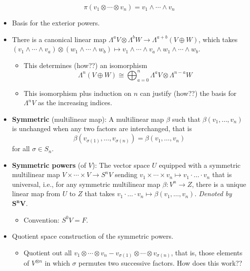 \documentclass[../notes.tex]{subfiles}
\begin{document}
\begin{itemize}
\begin{equation*}
        \pi(v_1\otimes\cdots\otimes v_n) = v_1\wedge\cdots\wedge v_n
    \end{equation*}
    \item Basis for the exterior powers.
    \item There is a canonical linear map $\Lambda^aV\otimes\Lambda^bW\to\Lambda^{a+b}(V\oplus W)$, which takes $(v_1\wedge\cdots\wedge v_a)\otimes(w_1\wedge\cdots\wedge w_b)\mapsto v_1\wedge\cdots\wedge v_a\wedge w_1\wedge\cdots\wedge w_b$.
    \begin{itemize}
        \item This determines (how??) an isomorphism
        \begin{equation*}
            \Lambda^n(V\oplus W) \cong \bigoplus_{a=0}^n\Lambda^aV\otimes\Lambda^{n-a}W
        \end{equation*}
        \item This isomorphism plus induction on $n$ can justify (how??) the basis for $\Lambda^nV$ as the increasing indices.
    \end{itemize}
    \item \textbf{Symmetric} (multilinear map): A multilinear map $\beta$ such that $\beta(v_1,\dots,v_n)$ is unchanged when any two factors are interchanged, that is
    \begin{equation*}
        \beta(v_{\sigma(1)},\dots,v_{\sigma(n)}) = \beta(v_1,\dots,v_n)
    \end{equation*}
    for all $\sigma\in S_n$.
    \item \textbf{Symmetric powers} (of $V$): The vector space $U$ equipped with a symmetric multilinear map $V\times\cdots\times V\to S^nV$ sending $v_1\times\cdots\times v_n\mapsto v_1\cdot\ldots\cdot v_n$ that is universal, i.e., for any symmetric multilinear map $\beta:V^n\to Z$, there is a unique linear map from $U$ to $Z$ that takes $v_1\cdot\ldots\cdot v_n\mapsto\beta(v_1,\dots,v_n)$. \emph{Denoted by} $\bm{S^nV}$.
    \begin{itemize}
        \item Convention: $S^0V=F$.
    \end{itemize}
    \item Quotient space construction of the symmetric powers.
    \begin{itemize}
        \item Quotient out all $v_1\otimes\cdots\otimes v_n-v_{\sigma(1)}\otimes\cdots\otimes v_{\sigma(n)}$, that is, those elements of $V^{\otimes n}$ in which $\sigma$ permutes two successive factors. How does this work??

\end{itemize}
\end{itemize}
\end{document}
